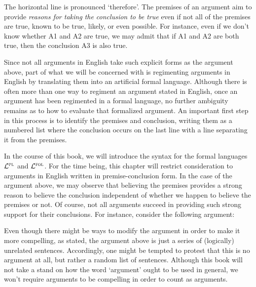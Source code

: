 The horizontal line is pronounced `therefore'.
The premises of an argument aim to provide \textit{reasons for taking the conclusion to be true} even if not all of the premises are true, known to be true, likely, or even possible.
For instance, even if we don't know whether A1 and A2 are true, we may admit that if A1 and A2 are both true, then the conclusion A3 is also true.

Since not all arguments in English take such explicit forms as the argument above, part of what we will be concerned with is regimenting arguments in English by translating them into an artificial formal language.
Although there is often more than one way to regiment an argument stated in English, once an argument has been regimented in a formal language, no further ambiguity remains as to how to evaluate that formalized argument.
An important first step in this process is to identify the premises and conclusion, writing them as a numbered list where the conclusion occurs on the last line with a line separating it from the premises.

In the course of this book, we will introduce the syntax for the formal languages $\mathcal{L}^{\textsc{pl}}$ and $\mathcal{L}^{\textsc{fol}}$.
For the time being, this chapter will restrict consideration to arguments in English written in premise-conclusion form.
In the case of the argument above, we may observe that believing the premises provides a strong reason to believe the conclusion independent of whether we happen to believe the premises or not.
Of course, not all arguments succeed in providing such strong support for their conclusions.
For instance, consider the following argument:

\label{argBunk}
\begin{earg}
\end{earg}

Even though there might be ways to modify the argument in order to make it more compelling, as stated, the argument above is just a series of (logically) unrelated sentences.
Accordingly, one might be tempted to protest that this is no argument at all, but rather a random list of sentences.
Although this book will not take a stand on how the word `argument' ought to be used in general, we won't require arguments to be compelling in order to count as arguments.

